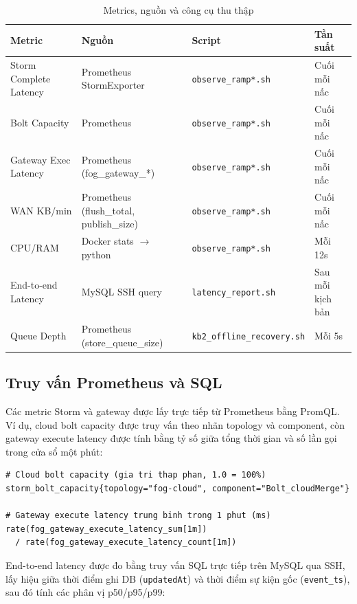 \documentclass[13pt,a4paper]{report}
\newcommand{\code}[1]{\texttt{\small #1}}
\begin{document}
\begin{table}[H]
\centering
\caption{Metrics, nguồn và công cụ thu thập}
\label{tab:metric-tool}
\small
\begin{tabular}{p{} p{} p{} p{}}
\toprule
\textbf{Metric} & \textbf{Nguồn} & \textbf{Script} & \textbf{Tần suất} \\
\midrule
Storm Complete Latency & Prometheus StormExporter & \code{observe\_ramp*.sh} & Cuối mỗi nấc \\
Bolt Capacity          & Prometheus               & \code{observe\_ramp*.sh} & Cuối mỗi nấc \\
Gateway Exec Latency   & Prometheus (fog\_gateway\_*) & \code{observe\_ramp*.sh} & Cuối mỗi nấc \\
WAN KB/min             & Prometheus (flush\_total, publish\_size) & \code{observe\_ramp*.sh} & Cuối mỗi nấc \\
CPU/RAM                & Docker stats $\to$ python & \code{observe\_ramp*.sh} & Mỗi 12s \\
End-to-end Latency     & MySQL SSH query           & \code{latency\_report.sh} & Sau mỗi kịch bản \\
Queue Depth            & Prometheus (store\_queue\_size) & \code{kb2\_offline\_recovery.sh} & Mỗi 5s \\
\bottomrule
\end{tabular}
\end{table}

\subsection{Truy vấn Prometheus và SQL}

Các metric Storm và gateway được lấy trực tiếp từ Prometheus bằng PromQL. Ví dụ,
cloud bolt capacity được truy vấn theo nhãn topology và component, còn gateway
execute latency được tính bằng tỷ số giữa tổng thời gian và số lần gọi trong cửa
sổ một phút:

\begin{lstlisting}[caption={Hai truy vấn PromQL tiêu biểu}]
# Cloud bolt capacity (gia tri thap phan, 1.0 = 100%)
storm_bolt_capacity{topology="fog-cloud", component="Bolt_cloudMerge"}

# Gateway execute latency trung binh trong 1 phut (ms)
rate(fog_gateway_execute_latency_sum[1m])
  / rate(fog_gateway_execute_latency_count[1m])
\end{lstlisting}

End-to-end latency được đo bằng truy vấn SQL trực tiếp trên MySQL qua SSH, lấy
hiệu giữa thời điểm ghi DB (\code{updatedAt}) và thời điểm sự kiện gốc
(\code{event\_ts}), sau đó tính các phân vị p50/p95/p99:
\end{document}
